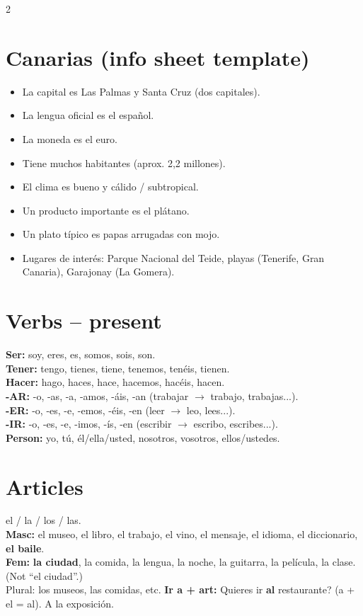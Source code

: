 \documentclass[10pt,landscape,a4paper]{article}
\begin{document}
\begin{multicols}{2}
\section*{\color{accent}Canarias (info sheet template)}
\begin{itemize}[leftmargin=*,nosep]
\item La capital es Las Palmas y Santa Cruz (dos capitales).
\item La lengua oficial es el espa\~nol.
\item La moneda es el euro.
\item Tiene muchos habitantes (aprox. 2,2 millones).
\item El clima es bueno y c\'alido / subtropical.
\item Un producto importante es el pl\'atano.
\item Un plato t\'ipico es papas arrugadas con mojo.
\item Lugares de inter\'es: Parque Nacional del Teide, playas (Tenerife, Gran Canaria), Garajonay (La Gomera).
\end{itemize}

\section*{\color{accent}Verbs -- present}
\textbf{Ser:} soy, eres, es, somos, sois, son.\\
\textbf{Tener:} tengo, tienes, tiene, tenemos, ten\'eis, tienen.\\
\textbf{Hacer:} hago, haces, hace, hacemos, hac\'eis, hacen.\\
\textbf{-AR:} -o, -as, -a, -amos, -\'ais, -an (trabajar $\to$ trabajo, trabajas...).\\
\textbf{-ER:} -o, -es, -e, -emos, -\'eis, -en (leer $\to$ leo, lees...).\\
\textbf{-IR:} -o, -es, -e, -imos, -\'is, -en (escribir $\to$ escribo, escribes...).\\
\textbf{Person:} yo, t\'u, \'el/ella/usted, nosotros, vosotros, ellos/ustedes.

\section*{\color{accent}Articles}
el / la / los / las.\\
\textbf{Masc:} el museo, el libro, el trabajo, el vino, el mensaje, el idioma, el diccionario, \textbf{el baile}.\\
\textbf{Fem:} \textbf{la ciudad}, la comida, la lengua, la noche, la guitarra, la pel\'icula, la clase. (Not ``el ciudad''.)\\
Plural: los museos, las comidas, etc. \textbf{Ir a + art:} \textquestiondown Quieres ir \textbf{al} restaurante? (a + el = al). A la exposici\'on.


\end{multicols}
\end{document}
